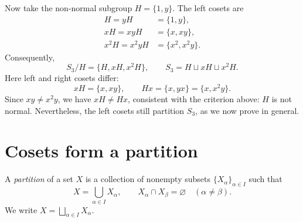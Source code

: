 \documentclass[reqno,11pt]{amsart}
\begin{document}
\begin{example}
Now take the non-normal subgroup $H=\{1,y\}$. The left cosets are
\begin{align*}
  H=yH&=\{1,y\},\\
  xH=xyH&=\{x,xy\},\\
  x^2H=x^2yH&=\{x^2,x^2y\}.
\end{align*}
Consequently,
\[
  S_3/H=\{H,xH,x^2H\},\qquad
  S_3=H\sqcup xH\sqcup x^2H.
\]
Here left and right cosets differ:
\[
  xH=\{x,xy\},\qquad Hx=\{x,yx\}=\{x,x^2y\}.
\]
Since $xy\neq x^2y$, we have $xH\neq Hx$, consistent with the criterion
above: $H$ is not normal. Nevertheless, the left cosets still partition
$S_3$, as we now prove in general.
\end{example}

\section{Cosets form a partition}

\begin{define}[Partition]
A \emph{partition} of a set $X$ is a collection of nonempty subsets
$\{X_\alpha\}_{\alpha\in I}$ such that
\[
  X=\bigcup_{\alpha\in I}X_\alpha,
  \qquad X_\alpha\cap X_\beta=\varnothing\quad(\alpha\neq\beta).
\]
We write $X=\bigsqcup_{\alpha\in I}X_\alpha$.
\end{define}
\end{document}
